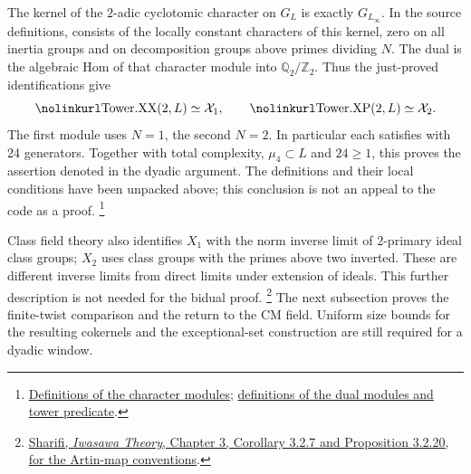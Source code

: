 The kernel of the \(2\)-adic cyclotomic character on \(G_L\)
is exactly \(G_{L_\infty}\).
In the source definitions,  consists of the locally
constant characters of this kernel, zero on all inertia groups
and on decomposition groups above primes dividing \(N\).
The dual  is the algebraic Hom of that character module
into \(\mathbb Q_2/\mathbb Z_2\).
Thus the just-proved identifications give
\[
 \text{\srcid{Tower.XX}}(2,L)\simeq\mathcal X_1,\qquad
 \text{\srcid{Tower.XP}}(2,L)\simeq\mathcal X_2.
\]
The first module uses \(N=1\), the second \(N=2\).
In particular each satisfies  with 24 generators.
Together with total complexity, \(\mu_4\subset L\) and \(24\geq1\),
this proves the assertion denoted  in the
dyadic argument.
The definitions and their local conditions have been unpacked
above; this conclusion is not an appeal to the code as a proof.
\footnote{\href{https://github.com/ChristianKudeba/alpoge-rh-verification/blob/alpoge-source-7cbf7a0c/src/Development/AutomorphicArithmetic/AutomorphicVarieties/GaloisLibrary/KummerTheory/Mk0IdMapCongr.lean}{Definitions of the character modules};
\href{https://github.com/ChristianKudeba/alpoge-rh-verification/blob/alpoge-source-7cbf7a0c/src/Development/AutomorphicArithmetic/AutomorphicVarieties/NumberFieldTowers/XTwApplyApply.lean}{definitions of the dual modules and tower predicate}.}

Class field theory also identifies \(X_1\) with the norm inverse limit
of \(2\)-primary ideal class groups; \(X_2\) uses class groups with
the primes above two inverted.
These are different inverse limits from direct limits under extension
of ideals. This further description is not needed for the bidual proof.
\footnote{\href{https://math.ucla.edu/~sharifi/notes/iwasawa-ch03.html}{Sharifi,
\emph{Iwasawa Theory}, Chapter 3, Corollary 3.2.7 and Proposition 3.2.20,
for the Artin-map conventions}.}
The next subsection proves the finite-twist comparison and the return
to the CM field. Uniform size bounds for the resulting cokernels and
the exceptional-set construction are still required for a dyadic window.

